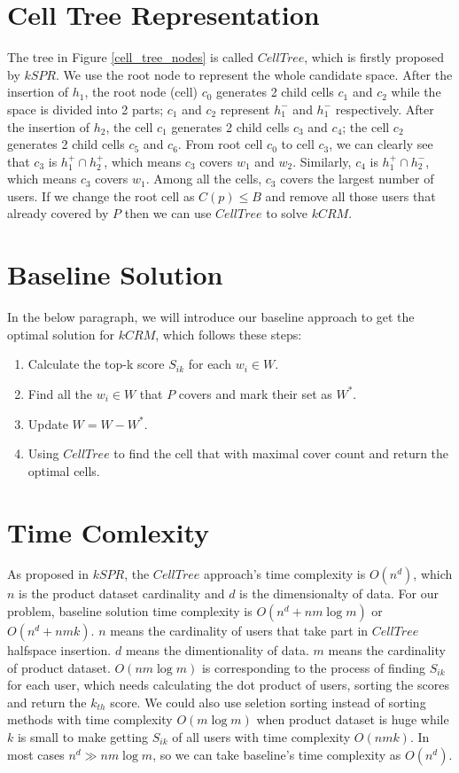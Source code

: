 \section{Cell Tree Representation}
The tree in Figure \ref{cell_tree_nodes} is called $CellTree$, which is firstly 
proposed by $kSPR$. We use the root node to represent the whole candidate space. 
After the insertion of $h_1$, the root node (cell) $c_0$ generates 2 child cells 
$c_1$ and $c_2$ while the space is divided into 2 parts; 
$c_1$ and $c_2$ represent $h_1^-$ and $h_1^-$ respectively. 
After the insertion of $h_2$, the cell $c_1$ generates 2 child cells $c_3$ and $c_4$; the cell $c_2$ generates 2 child cells $c_5$ and $c_6$. From root cell $c_0$ to cell $c_3$, we can clearly see that $c_3$ is $h_1^+\cap h_2^+$, which means $c_3$ covers $w_1$ and $w_2$. Similarly, $c_4$ is $h_1^+\cap h_2^-$, which means $c_3$ covers $w_1$. Among all the cells, $c_3$ covers the largest number of users. If we change the root cell as $C(p) \leq B$ and remove all those users that already covered by $P$ then we can use $CellTree$ to solve $kCRM$.


\section{Baseline Solution}
In the below paragraph, we will introduce our baseline approach to get the optimal solution for $kCRM$, which follows these steps:
\begin{enumerate}
\item Calculate the top-k score $S_{ik}$ for each $w_i\in W$.
\item Find all the $w_i\in W$ that $P$ covers and mark their set as $W^*$.
\item Update $W=W-W^*$.
\item Using $CellTree$ to find the cell that with maximal cover count and return the optimal cells. 
\end{enumerate}

\section{Time Comlexity}
\label{baseline_tc}
As proposed in $kSPR$, the $CellTree$ approach's time complexity is $O(n^d)$, which 
$n$ is the product dataset cardinality and $d$ is the dimensionalty of data.
For our problem, baseline solution time complexity is $O(n^d+nm\log m)$ or $O(n^d+nmk)$. 
$n$ means the cardinality of users that take part in $CellTree$ halfspace insertion. 
$d$ means the dimentionality of data.
$m$ means the cardinality of product dataset.
$O(nm\log m)$ is corresponding to the process of finding $S_{ik}$ for each user, which needs
calculating the dot product of users, sorting the scores and return the $k_{th}$ score.
We could also use seletion sorting instead of sorting methods with time complexity $O(m\log m)$
when product dataset is huge while $k$ is small to make getting $S_{ik}$ of all users
with time complexity $O(nmk)$.  
In most cases $n^d\gg nm\log m$, so we can take baseline's time complexity as $O(n^d)$.
